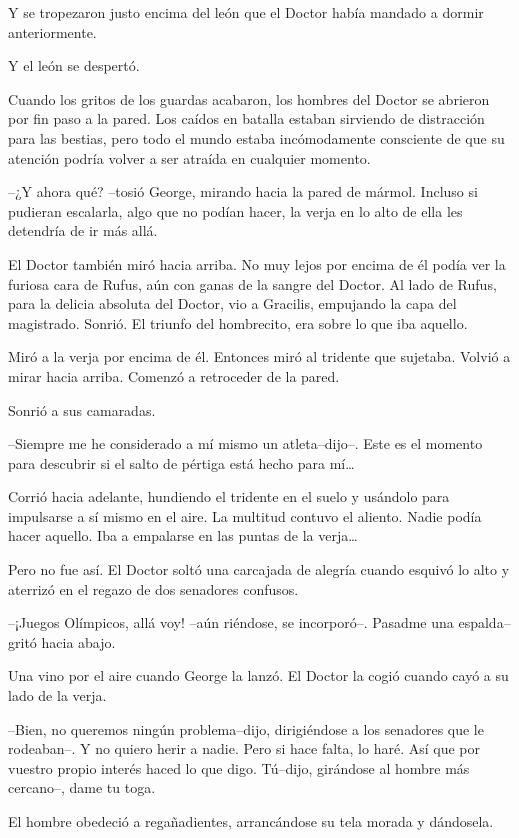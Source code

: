 Y se tropezaron justo encima del león que el Doctor había mandado a
dormir anteriormente.

Y el león se despertó.

Cuando los gritos de los guardas acabaron, los hombres del Doctor se
abrieron por fin paso a la pared. Los caídos en batalla estaban
sirviendo de distracción para las bestias, pero todo el mundo estaba
incómodamente consciente de que su atención podría volver a ser atraída
en cualquier momento.

--¿Y ahora qué? --tosió George, mirando hacia la pared de mármol.
Incluso si pudieran escalarla, algo que no podían hacer, la verja en lo
alto de ella les detendría de ir más allá.

El Doctor también miró hacia arriba. No muy lejos por encima de él podía
ver la furiosa cara de Rufus, aún con ganas de la sangre del Doctor. Al
lado de Rufus, para la delicia absoluta del Doctor, vio a Gracilis,
empujando la capa del magistrado. Sonrió. El triunfo del hombrecito, era
sobre lo que iba aquello.

Miró a la verja por encima de él. Entonces miró al tridente que
sujetaba. Volvió a mirar hacia arriba. Comenzó a retroceder de la pared.

Sonrió a sus camaradas.

--Siempre me he considerado a mí mismo un atleta--dijo--. Este es el
momento para descubrir si el salto de pértiga está hecho para mí\ldots{}

Corrió hacia adelante, hundiendo el tridente en el suelo y usándolo para
impulsarse a sí mismo en el aire. La multitud contuvo el aliento. Nadie
podía hacer aquello. Iba a empalarse en las puntas de la verja\ldots{}

Pero no fue así. El Doctor soltó una carcajada de alegría cuando esquivó
lo alto y aterrizó en el regazo de dos senadores confusos.

--¡Juegos Olímpicos, allá voy! --aún riéndose, se incorporó--. Pasadme
una espalda--gritó hacia abajo.

Una vino por el aire cuando George la lanzó. El Doctor la cogió cuando
cayó a su lado de la verja.

--Bien, no queremos ningún problema--dijo, dirigiéndose a los senadores
que le rodeaban--. Y no quiero herir a nadie. Pero si hace falta, lo
haré. Así que por vuestro propio interés haced lo que digo. Tú--dijo,
girándose al hombre más cercano--, dame tu toga.

El hombre obedeció a regañadientes, arrancándose su tela morada y
dándosela.

